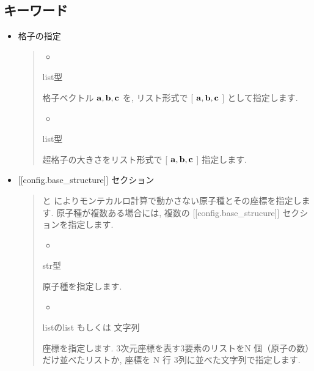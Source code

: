 \documentclass[letterpaper,10pt,dvipdfmx]{sphinxmanual}
\begin{document}
\subsection{キーワード}
\label{\detokenize{file_specification/parameter_config:id2}}\begin{itemize}
\item {} 
格子の指定
\begin{quote}
\begin{itemize}
\item {} 

\end{itemize}

 list型

格子ベクトル \(\bf{a}, \bf{b}, \bf{c}\) を,
リスト形式で {[} \(\bf{a}, \bf{b}, \bf{c}\) {]} として指定します.
\begin{itemize}
\item {} 

\end{itemize}

 list型

超格子の大きさをリスト形式で {[} \(\bf{a}, \bf{b}, \bf{c}\) {]} 指定します.
\end{quote}

\item {} 
{[}{[}config.base\_structure{]}{]} セクション
\begin{quote}

 と  によりモンテカルロ計算で動かさない原子種とその座標を指定します.
原子種が複数ある場合には, 複数の {[}{[}config.base\_strucure{]}{]} セクションを指定します.
\begin{itemize}
\item {} 

\end{itemize}

 str型

  原子種を指定します.
\begin{itemize}
\item {} 

\end{itemize}

 listのlist もしくは 文字列

  座標を指定します.
3次元座標を表す3要素のリストをN 個（原子の数）だけ並べたリストか, 座標を N 行 3列に並べた文字列で指定します.
\end{quote}


\end{itemize}
\end{document}
